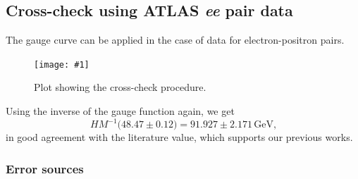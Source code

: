 \documentclass[twocolumn]{article}
\newcommand{\insertFigure}[1]{%
   \texttt{[image: \#1]}%
}
\begin{document}
\subsection{Cross-check using ATLAS \textit{ee} pair data}
The gauge curve can be applied in the case of data for electron-positron pairs. 
\begin{figure}[!h]
\centering
\insertFigure{Images/ZeeCheck.png}
\caption{Plot showing the cross-check procedure.}
\label{fig:crosscheck}
\end{figure}
Using the inverse of the gauge function again, we get
\begin{equation}
HM^{-1} \big(48.47 \pm 0.12\big) = 91.927 \pm 2.171 \, \text{GeV,}
\end{equation}
in good agreement with the literature value, which supports our previous works.
\subsubsection{Error sources}
\end{document}
